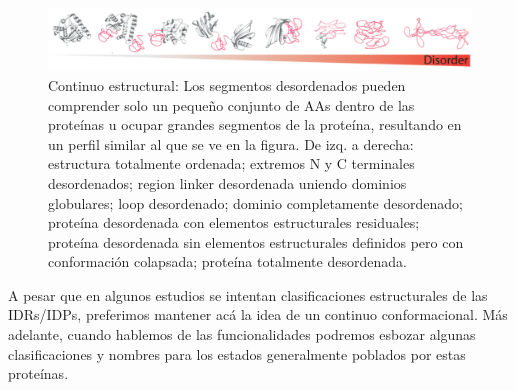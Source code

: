 \begin{figure}[htbp]
\centering
\includegraphics[width=1.0\textwidth]{img/conformationContinuum.png} 
\caption{ Continuo estructural: Los segmentos desordenados pueden comprender solo un pequeño conjunto de AAs dentro de las proteínas u ocupar grandes segmentos de la proteína, resultando en un
perfil similar al que se ve en la figura. De izq. a derecha: estructura totalmente ordenada; extremos N y C terminales desordenados; region linker desordenada uniendo dominios globulares; loop desordenado;
dominio completamente desordenado; proteína desordenada con elementos estructurales residuales; proteína desordenada sin elementos estructurales definidos pero con conformación colapsada; proteína totalmente desordenada.
}
\label{conformationContinuum}
\end{figure}






A pesar que en algunos estudios se intentan clasificaciones estructurales de las IDRs/IDPs, preferimos mantener acá la idea de un continuo conformacional.
Más adelante, cuando hablemos de las funcionalidades podremos esbozar algunas clasificaciones y nombres para los estados generalmente poblados por estas proteínas. 



